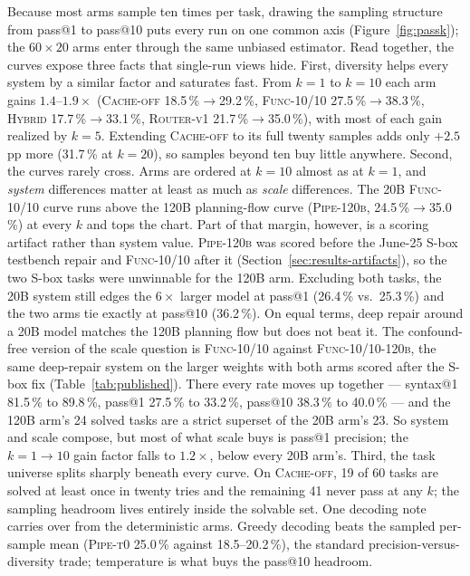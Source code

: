 Because most arms sample ten times per task, drawing the sampling
structure from pass@1 to pass@10 puts every run on one common axis
(Figure~\ref{fig:passk}); the $60\times20$ arms enter through the same
unbiased estimator. Read together, the curves expose three facts that
single-run views hide. First, diversity helps every system by a similar
factor and saturates fast. From $k{=}1$ to $k{=}10$ each arm gains
$1.4$--$1.9\times$ (\textsc{Cache-off} 18.5\,\%$\to$29.2\,\%,
\textsc{Func-10/10} 27.5\,\%$\to$38.3\,\%, \textsc{Hybrid}
17.7\,\%$\to$33.1\,\%, \textsc{Router-v1} 21.7\,\%$\to$35.0\,\%), with
most of each gain realized by $k{=}5$. Extending \textsc{Cache-off} to
its full twenty samples adds only $+2.5$\,pp more (31.7\,\% at
$k{=}20$), so samples beyond ten buy little anywhere. Second, the
curves rarely cross. Arms are ordered at $k{=}10$ almost as at
$k{=}1$, and \emph{system} differences matter at least as much as
\emph{scale} differences. The 20B \textsc{Func-10/10} curve runs
above the 120B planning-flow curve (\textsc{Pipe-120b},
24.5\,\%$\to$35.0\,\%) at every $k$ and tops the chart. Part of that
margin, however, is a scoring artifact rather than system value.
\textsc{Pipe-120b} was scored before the June-25 S-box testbench
repair and \textsc{Func-10/10} after it
(Section~\ref{sec:results-artifacts}), so the two S-box tasks were
unwinnable for the 120B arm. Excluding both tasks, the 20B system
still edges the $6\times$ larger model at pass@1 (26.4\,\% vs.\
25.3\,\%) and the two arms tie exactly at pass@10 (36.2\,\%). On equal
terms, deep repair around a 20B model matches the 120B planning flow but
does not beat it. The confound-free version of the scale question is
\textsc{Func-10/10} against \textsc{Func-10/10-120b}, the same
deep-repair system on the larger weights with both arms scored after
the S-box fix (Table~\ref{tab:published}). There every rate moves up
together --- syntax@1 81.5\,\% to 89.8\,\%, pass@1 27.5\,\% to
33.2\,\%, pass@10 38.3\,\% to 40.0\,\% --- and the 120B arm's 24
solved tasks are a strict superset of the 20B arm's 23. So system and
scale compose, but most of what scale buys is pass@1 precision; the
$k{=}1{\to}10$ gain factor falls to $1.2\times$, below every 20B
arm's.
Third, the task universe
splits sharply beneath every curve. On \textsc{Cache-off}, 19 of 60
tasks are solved at least once in twenty tries and the remaining 41
never pass at any $k$; the sampling headroom lives entirely inside
the solvable set. One decoding note carries over from the deterministic
arms. Greedy decoding beats the sampled per-sample mean
(\textsc{Pipe-t0} 25.0\,\% against 18.5--20.2\,\%), the standard
precision-versus-diversity trade; temperature is what buys the pass@10
headroom.

